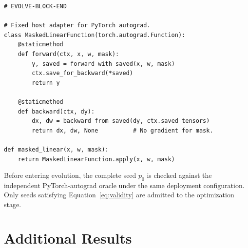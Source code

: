 \begin{lstlisting}
# EVOLVE-BLOCK-END

# Fixed host adapter for PyTorch autograd.
class MaskedLinearFunction(torch.autograd.Function):
    @staticmethod
    def forward(ctx, x, w, mask):
        y, saved = forward_with_saved(x, w, mask)
        ctx.save_for_backward(*saved)
        return y

    @staticmethod
    def backward(ctx, dy):
        dx, dw = backward_from_saved(dy, ctx.saved_tensors)
        return dx, dw, None          # No gradient for mask.

def masked_linear(x, w, mask):
    return MaskedLinearFunction.apply(x, w, mask)
\end{lstlisting}

Before entering evolution, the complete seed $p_0$ is checked against the independent PyTorch-autograd oracle under the same deployment configuration. Only seeds satisfying Equation~\ref{eq:validity} are admitted to the optimization stage.


\section{Additional Results}
\label{sec:additional_results}

  


